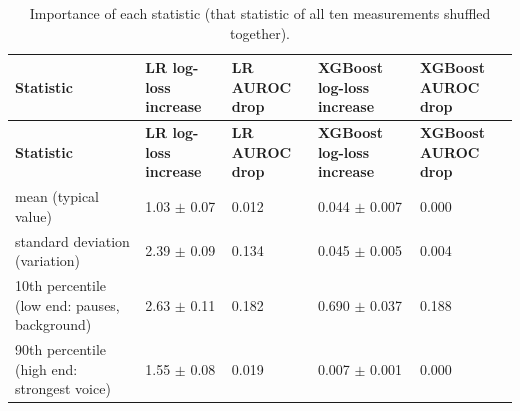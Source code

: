 \documentclass[11pt,a4paper]{article}
\begin{document}
\begin{center}\small\renewcommand{\arraystretch}{1.15}
\begin{longtable}{>{\raggedright\arraybackslash}p{4.40cm}>{\raggedleft\arraybackslash}p{2.50cm}>{\raggedleft\arraybackslash}p{2.50cm}>{\raggedleft\arraybackslash}p{2.50cm}>{\raggedleft\arraybackslash}p{2.50cm}}
\caption{Importance of each statistic (that statistic of all ten measurements shuffled together).}\\
\toprule
\textbf{\hspace{0pt}Statistic} & \textbf{\hspace{0pt}LR log-loss increase} & \textbf{\hspace{0pt}LR AUROC drop} & \textbf{\hspace{0pt}XGBoost log-loss increase} & \textbf{\hspace{0pt}XGBoost AUROC drop}\\\midrule\endfirsthead
\toprule
\textbf{\hspace{0pt}Statistic} & \textbf{\hspace{0pt}LR log-loss increase} & \textbf{\hspace{0pt}LR AUROC drop} & \textbf{\hspace{0pt}XGBoost log-loss increase} & \textbf{\hspace{0pt}XGBoost AUROC drop}\\\midrule\endhead
\bottomrule\endfoot
\hspace{0pt}mean (typical value) & \hspace{0pt}1.03 $\pm$ 0.07 & \hspace{0pt}0.012 & \hspace{0pt}0.044 $\pm$ 0.007 & \hspace{0pt}0.000\\
\hspace{0pt}standard deviation (variation) & \hspace{0pt}2.39 $\pm$ 0.09 & \hspace{0pt}0.134 & \hspace{0pt}0.045 $\pm$ 0.005 & \hspace{0pt}0.004\\
\hspace{0pt}10th percentile (low end: pauses, background) & \hspace{0pt}2.63 $\pm$ 0.11 & \hspace{0pt}0.182 & \hspace{0pt}0.690 $\pm$ 0.037 & \hspace{0pt}0.188\\
\hspace{0pt}90th percentile (high end: strongest voice) & \hspace{0pt}1.55 $\pm$ 0.08 & \hspace{0pt}0.019 & \hspace{0pt}0.007 $\pm$ 0.001 & \hspace{0pt}0.000\\
\end{longtable}\end{center}
\end{document}
